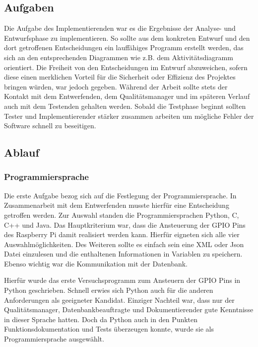 
\subsection{Aufgaben}
Die Aufgabe des Implementierenden war es die Ergebnisse der Analyse- und Entwurfsphase zu implementieren. So sollte aus dem konkreten Entwurf und den dort getroffenen Entscheidungen ein lauffähiges Programm erstellt werden, das sich an den entsprechenden Diagrammen wie z.B. dem Aktivitätsdiagramm orientiert. Die Freiheit von den Entscheidungen im Entwurf abzuweichen, sofern diese einen merklichen Vorteil für die Sicherheit oder Effizienz des Projektes bringen würden, war jedoch gegeben. Während der Arbeit sollte stets der Kontakt mit dem Entwerfenden, dem Qualitätsmanager und im späteren Verlauf auch mit dem Testenden gehalten werden. Sobald die Testphase beginnt sollten Tester und Implementierender stärker zusammen arbeiten um mögliche Fehler der Software schnell zu beseitigen.

\subsection{Ablauf}
\subsubsection{Programmiersprache}
Die erste Aufgabe bezog sich auf die Festlegung der Programmiersprache. In Zusammenarbeit mit dem Entwerfenden musste hierfür eine Entscheidung getroffen werden. Zur Auswahl standen die Programmiersprachen Python, C, C++ und Java. Das Hauptkriterium war, dass die Ansteuerung der GPIO Pins des Raspberry Pi damit realisiert werden kann. Hierfür eigneten sich alle vier Auswahlmöglichkeiten. Des Weiteren sollte es einfach sein eine XML oder Json Datei einzulesen und die enthaltenen Informationen in Variablen zu speichern. Ebenso wichtig war die Kommunikation mit der Datenbank.

Hierfür wurde das erste Versuchsprogramm zum Ansteuern der GPIO Pins in Python geschrieben. Schnell erwies sich Python auch für die anderen Anforderungen als geeigneter Kandidat. Einziger Nachteil war, dass nur der Qualitätsmanager, Datenbankbeauftragte und Dokumentierender gute Kenntnisse in dieser Sprache hatten. Doch da Python auch in den Punkten Funktionsdokumentation und Tests überzeugen konnte, wurde sie als Programmiersprache ausgewählt.

